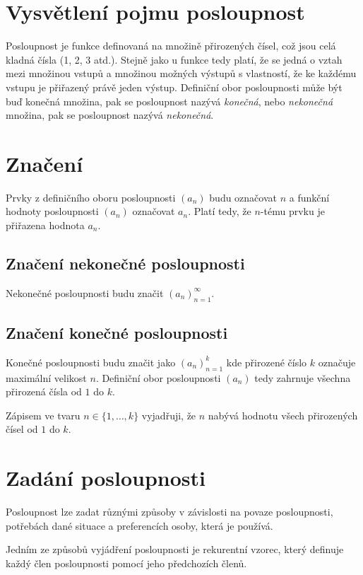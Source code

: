\documentclass[12pt]{report}			%
\begin{document}
		\section{Vysvětlení pojmu posloupnost}
Posloupnost je funkce definovaná na množině přirozených čísel, což jsou celá kladná čísla (1, 2, 3 atd.). Stejně jako u funkce tedy platí, že se jedná o vztah mezi množinou vstupů a množinou možných výstupů s vlastností, že ke každému vstupu je přiřazený právě jeden výstup. Definiční obor posloupnosti může být buď konečná množina, pak se posloupnost nazývá \emph{konečná}, nebo \emph{nekonečná} množina, pak se posloupnost nazývá \emph{nekonečná}.
		\section{Značení}
Prvky z definičního oboru posloupnosti $(a_n)$ budu označovat $n$ a funkční hodnoty posloupnosti $(a_n)$ označovat $a_n$. Platí tedy, že $n$-tému prvku je přiřazena hodnota $a_n$.
		\subsection{Značení nekonečné posloupnosti}
Nekonečné posloupnosti budu značit $(a_n)_{n=1}^{\infty} $.
		\subsection{Značení konečné posloupnosti}
Konečné posloupnosti budu značit jako $(a_n)_{n=1}^k$ kde přirozené číslo $k$ označuje maximální velikost $n$. Definiční obor posloupnosti $(a_n)$ tedy zahrnuje všechna přirozená čísla od $1$ do $k$. 

Zápisem ve tvaru $n \in \{1, \dots, k\}$ vyjadřuji, že $n$ nabývá hodnotu všech přirozených čísel od $1$ do $k$.

\section{Zadání posloupnosti}
Posloupnost lze zadat různými způsoby v závislosti na povaze posloupnosti, potřebách dané situace a preferencích osoby, která je používá.

Jedním ze způsobů vyjádření posloupnosti je rekurentní vzorec, který definuje každý člen posloupnosti pomocí jeho předchozích členů. 
\end{document}

